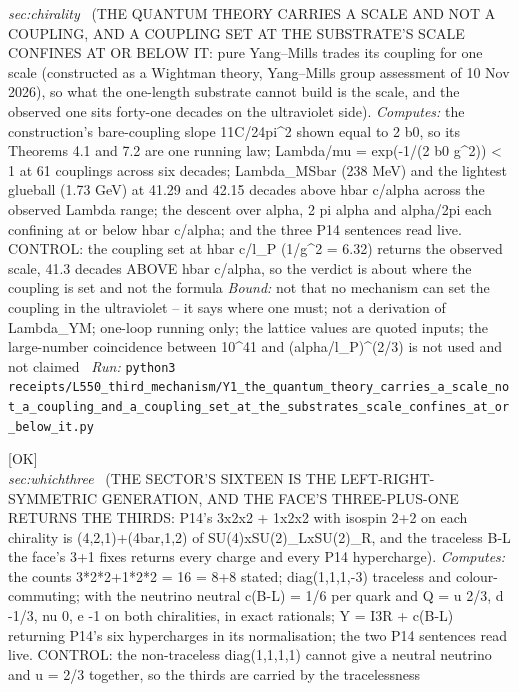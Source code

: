 \begin{description}
\textit{sec:chirality} \ (THE QUANTUM THEORY CARRIES A SCALE AND NOT A COUPLING, AND A COUPLING SET AT THE SUBSTRATE'S SCALE CONFINES AT OR BELOW IT: pure Yang--Mills trades its coupling for one scale (constructed as a Wightman theory, Yang--Mills group assessment of 10 Nov 2026), so what the one-length substrate cannot build is the scale, and the observed one sits forty-one decades on the ultraviolet side). 
\emph{Computes:} the construction's bare-coupling slope 11C/24pi\textasciicircum{}2 shown equal to 2 b0, so its Theorems 4.1 and 7.2 are one running law; Lambda/mu = exp(-1/(2 b0 g\textasciicircum{}2)) < 1 at 61 couplings across six decades; Lambda\_MSbar (238 MeV) and the lightest glueball (1.73 GeV) at 41.29 and 42.15 decades above hbar c/alpha across the observed Lambda range; the descent over alpha, 2 pi alpha and alpha/2pi each confining at or below hbar c/alpha; and the three P14 sentences read live. CONTROL: the coupling set at hbar c/l\_P (1/g\textasciicircum{}2 = 6.32) returns the observed scale, 41.3 decades ABOVE hbar c/alpha, so the verdict is about where the coupling is set and not the formula
 \emph{Bound:} not that no mechanism can set the coupling in the ultraviolet -- it says where one must; not a derivation of Lambda\_YM; one-loop running only; the lattice values are quoted inputs; the large-number coincidence between 10\textasciicircum{}41 and (alpha/l\_P)\textasciicircum{}(2/3) is not used and not claimed
\ \emph{Run:} \texttt{python3 receipts/L550\_third\_mechanism/Y1\_the\_quantum\_theory\_carries\_a\_scale\_not\_a\_coupling\_and\_a\_coupling\_set\_at\_the\_substrates\_scale\_confines\_at\_or\_below\_it.py}
\item[\label{rcpt:Y2_the_sectors_sixteen_is_the_left_right_symmetric_generation_and_the_faces_three_plus_one_returns_the_thirds}\textbf{}\quad\texttt{Y2\_the\_sectors\_sixteen\_is\_the\_left\_right\_symmetric\_generation\_and\_the\_faces\_three\_plus\_one\_returns\_the\_thirds}]\hfill\textsf{[OK]}\\
\textit{sec:whichthree} \ (THE SECTOR'S SIXTEEN IS THE LEFT-RIGHT-SYMMETRIC GENERATION, AND THE FACE'S THREE-PLUS-ONE RETURNS THE THIRDS: P14's 3x2x2 + 1x2x2 with isospin 2+2 on each chirality is (4,2,1)+(4bar,1,2) of SU(4)xSU(2)\_LxSU(2)\_R, and the traceless B-L the face's 3+1 fixes returns every charge and every P14 hypercharge). 
\emph{Computes:} the counts 3*2*2+1*2*2 = 16 = 8+8 stated; diag(1,1,1,-3) traceless and colour-commuting; with the neutrino neutral c(B-L) = 1/6 per quark and Q = u 2/3, d -1/3, nu 0, e -1 on both chiralities, in exact rationals; Y = I3R + c(B-L) returning P14's six hypercharges in its normalisation; the two P14 sentences read live. CONTROL: the non-traceless diag(1,1,1,1) cannot give a neutral neutrino and u = 2/3 together, so the thirds are carried by the tracelessness

\end{description}
